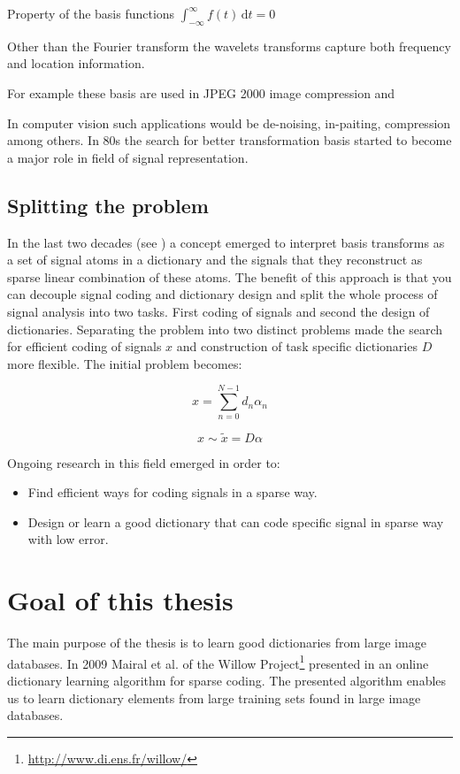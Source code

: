 Property of the basis functions 
$\int_{-\infty}^{\infty} \! f(t) \, \mathrm{d}t = 0$

\Todo{}
Other than the Fourier transform the wavelets transforms capture both frequency
and location information.

For example these basis are used in JPEG 2000 image compression and 

In computer vision such applications would be de-noising, in-paiting,
compression among others. In 80s the search for better transformation basis
started to become a major role in field of signal representation.\cite{}


\subsection{Splitting the problem}
\cite{Rubinstein2010}
In the last two decades (see\cite{Olshausen1996,Mallat1993} ) a concept emerged
to interpret basis transforms as a set of signal atoms in a dictionary and the
signals that they reconstruct as sparse
linear combination of these atoms.  The benefit of this approach is that you can
decouple signal coding and dictionary design and split the whole process of
signal analysis into two tasks. First coding of signals and second the design
of dictionaries. Separating the problem into two distinct problems made the
search for efficient coding of signals $x$ and construction of task specific
dictionaries $D$ more flexible\cite{?}. The initial problem becomes:

\begin{equation}
x = \sum_{n=0}^{N-1}d_n\alpha_n
\end{equation}

\begin{equation}
 x \sim \tilde{x} = D\alpha
\end{equation}

Ongoing research in this field emerged in order to:
\begin{itemize}
 \item Find efficient ways for coding signals in a sparse way.
 \item Design or learn a good dictionary that can code specific signal in sparse
way with low error.
\end{itemize}


\section{Goal of this thesis}
The main purpose of the thesis is to learn good dictionaries from large
image databases. %
In 2009 Mairal et al. of the Willow
Project\footnote{\url{http://www.di.ens.fr/willow/}} presented in
\cite{Mairal2009,Mairal2010} an online dictionary learning algorithm for sparse
coding. The presented algorithm enables us to learn dictionary elements from
large training sets found in large image databases.


